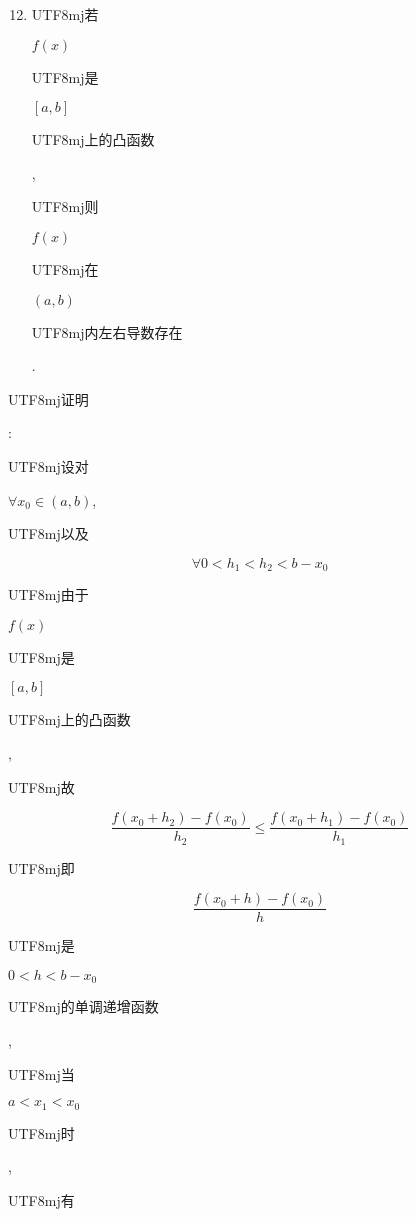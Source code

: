 \documentclass[10pt]{article}
\begin{document}
\begin{enumerate}
  \setcounter{enumi}{11}
  \item \begin{CJK}{UTF8}{mj}若\end{CJK} $f(x)$ \begin{CJK}{UTF8}{mj}是\end{CJK} $[a, b]$ \begin{CJK}{UTF8}{mj}上的凸函数\end{CJK}, \begin{CJK}{UTF8}{mj}则\end{CJK} $f(x)$ \begin{CJK}{UTF8}{mj}在\end{CJK} $(a, b)$ \begin{CJK}{UTF8}{mj}内左右导数存在\end{CJK}.
\end{enumerate}
\begin{CJK}{UTF8}{mj}证明\end{CJK}: \begin{CJK}{UTF8}{mj}设对\end{CJK} $\forall x_{0} \in(a, b)$, \begin{CJK}{UTF8}{mj}以及\end{CJK}
$$
\forall 0<h_{1}<h_{2}<b-x_{0}
$$
\begin{CJK}{UTF8}{mj}由于\end{CJK} $f(x)$ \begin{CJK}{UTF8}{mj}是\end{CJK} $[a, b]$ \begin{CJK}{UTF8}{mj}上的凸函数\end{CJK}, \begin{CJK}{UTF8}{mj}故\end{CJK}
$$
\frac{f\left(x_{0}+h_{2}\right)-f\left(x_{0}\right)}{h_{2}} \leqslant \frac{f\left(x_{0}+h_{1}\right)-f\left(x_{0}\right)}{h_{1}}
$$
\begin{CJK}{UTF8}{mj}即\end{CJK}
$$
\frac{f\left(x_{0}+h\right)-f\left(x_{0}\right)}{h}
$$
\begin{CJK}{UTF8}{mj}是\end{CJK} $0<h<b-x_{0}$ \begin{CJK}{UTF8}{mj}的单调递增函数\end{CJK}, \begin{CJK}{UTF8}{mj}当\end{CJK} $a<x_{1}<x_{0}$ \begin{CJK}{UTF8}{mj}时\end{CJK}, \begin{CJK}{UTF8}{mj}有\end{CJK}
\end{document}
